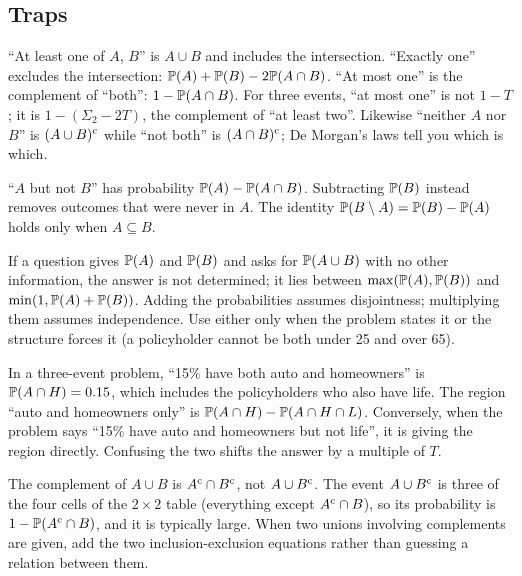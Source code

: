\subsection{Traps}

\begin{trap}
``At least one of $A$, $B$'' is $A \cup B$ and includes the intersection. ``Exactly
one'' excludes the intersection: $\mathbb{P}(A) + \mathbb{P}(B) - 2\mathbb{P}(A\cap B)$. ``At most
one'' is the complement of ``both'': $1 - \mathbb{P}(A \cap B)$. For three events,
``at most one'' is not $1 - T$; it is $1 - (\Sigma_2 - 2T)$, the complement of ``at
least two''. Likewise ``neither $A$ nor $B$'' is $(A\cup B)^{\mathrm{c}}$ while ``not both''
is $(A \cap B)^{\mathrm{c}}$; De Morgan's laws tell you which is which. \end{trap}

\begin{trap}
``$A$ but not $B$'' has probability $\mathbb{P}(A) - \mathbb{P}(A \cap B)$. Subtracting
$\mathbb{P}(B)$ instead removes outcomes that were never in $A$. The identity
$\mathbb{P}(B \setminus A) = \mathbb{P}(B) - \mathbb{P}(A)$ holds only when $A \subseteq B$.
\end{trap}

\begin{trap}
If a question gives $\mathbb{P}(A)$ and $\mathbb{P}(B)$ and asks for $\mathbb{P}(A \cup B)$ with
no other information, the answer is not determined; it lies between
$\max(\mathbb{P}(A),\mathbb{P}(B))$ and $\min(1, \mathbb{P}(A)+\mathbb{P}(B))$. Adding the probabilities
assumes disjointness; multiplying them assumes independence. Use either only when
the problem states it or the structure forces it (a policyholder cannot be both
under 25 and over 65).
\end{trap}

\begin{trap}
In a three-event problem, ``15\% have both auto and homeowners'' is
$\mathbb{P}(A \cap H) = 0.15$, which includes the policyholders who also have life.
The region ``auto and homeowners only'' is $\mathbb{P}(A\cap H) - \mathbb{P}(A\cap H\cap L)$.
Conversely, when the problem says ``15\% have auto and homeowners but not life'',
it is giving the region directly. Confusing the two shifts the answer by a multiple of $T$.
\end{trap}

\begin{trap}
The complement of $A \cup B$ is $A^{\mathrm{c}} \cap B^{\mathrm{c}}$, not $A \cup B^{\mathrm{c}}$. The event
$A \cup B^{\mathrm{c}}$ is three of the four cells of the $2 \times 2$ table (everything except
$A^{\mathrm{c}} \cap B$), so its probability is $1 - \mathbb{P}(A^{\mathrm{c}} \cap B)$, and it is
typically large. When two unions involving complements are given, add the two
inclusion-exclusion equations rather than guessing a relation between them.
\end{trap}

